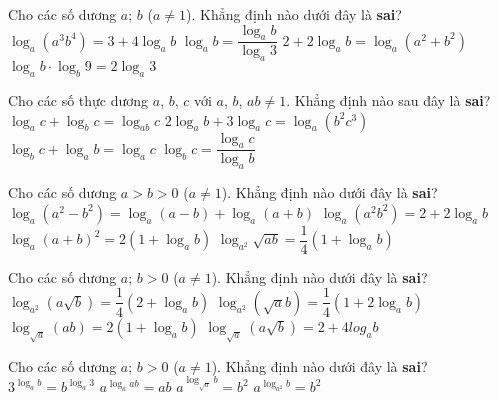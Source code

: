 \begin{ex}%
	Cho các số dương $a$; $b$ ($a\neq 1$). Khẳng định nào dưới đây là \textbf{sai}? 
	\choice
	{$\log_a\left(a^3b^4\right)=3+4\log_ab$}
	{$\log_ab=\dfrac{\log_ab}{\log_a3}$}
	{\True $2+2\log_ab=\log_a\left(a^2+b^2\right)$}
	{$\log_ab\cdot\log_b9=2\log_a3$}
\end{ex}

\begin{ex}%
	Cho các số thực dương $a$, $b$, $c$ với $a$, $b$, $ab \neq 1$. Khẳng định nào sau đây là \textbf{sai}? 
	\choice
	{\True $\log_ac+\log_bc=\log_{ab}c$}
	{$2\log_ab+3\log_ac=\log_a\left(b^2c^3\right)$}
	{$\log_bc+\log_ab=\log_ac$}
	{$\log_bc=\dfrac{\log_ac}{\log_ab}$}
\end{ex}

\begin{ex}%
	Cho các số dương $a>b>0$ ($a\neq 1$). Khẳng định nào dưới đây là \textbf{sai}? 
	\choice
	{$\log_a\left(a^2-b^2\right)=\log_a(a-b)+\log_a(a+b)$}
	{$\log_a\left(a^2b^2\right)=2+2\log_ab$}
	{\True $\log_a(a+b)^2=2(1+\log_ab)$}
	{$\log_{a^2}\sqrt{ab}=\dfrac{1}{4}(1+\log_ab)$}
\end{ex}

\begin{ex}%
	Cho các số dương $a$; $b>0$ ($a\neq 1$). Khẳng định nào dưới đây là \textbf{sai}?
	\choice
	{$\log_{a^2}(a\sqrt{b})=\dfrac{1}{4}(2+\log_ab)$}
	{$\log_{a^2}(\sqrt{a}b)=\dfrac{1}{4}\left(1+2\log_ab\right)$}
	{$\log_{\sqrt{a}}(ab)=2(1+\log_ab)$}
	{\True $\log_{\sqrt{a}}(a\sqrt{b})=2+4log_ab$}
\end{ex}

\begin{ex}%
	Cho các số dương $a$; $b>0$ ($a\neq 1$). Khẳng định nào dưới đây là \textbf{sai}? 
	\choice
	{$3^{\log_ab}=b^{\log_a3}$}
	{$a^{\log_aab}=ab$}
	{$a^{\log_{\sqrt{a}}b}=b^2$}
	{\True $a^{\log_{a^2}b}=b^2$}
\end{ex}

